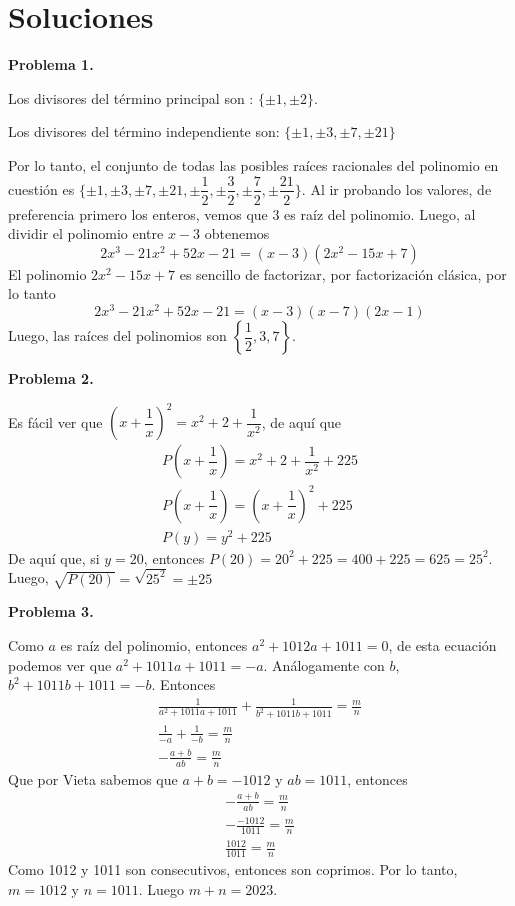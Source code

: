 \newpage
\section*{\large Soluciones}

    \textbf{Problema 1.}

Los divisores del término principal son : $\{\pm 1, \pm 2\}$.

Los divisores del término independiente son: $\{\pm 1, \pm 3, \pm 7, \pm 21\}$

Por lo tanto, el conjunto de todas las posibles raíces racionales del polinomio en cuestión es $\{\pm 1, \pm 3, \pm 7, \pm 21, \pm \dfrac{1}{2}, \pm \dfrac{3}{2}, \pm \dfrac{7}{2}, \pm \dfrac{21}{2}\}.$
Al ir probando los valores, de preferencia primero los enteros, vemos que $3$ es raíz del polinomio.
Luego, al dividir el polinomio entre $x - 3$ obtenemos
\[2 x^3 - 21 x^2 + 52 x - 21 = (x - 3)(2x^2 - 15x + 7)\]
El polinomio $2x^2 - 15x + 7$ es sencillo de factorizar, por factorización clásica, por lo tanto
\[2 x^3 - 21 x^2 + 52 x - 21 = (x - 3)(x - 7)(2x - 1)\]
Luego, las raíces del polinomios son $\left\{ \dfrac{1}{2}, 3, 7 \right\}$.


\textbf{Problema 2.}

Es fácil ver que $\left(x + \dfrac{1}{x}\right)^2 = x^2 + 2 + \dfrac{1}{x^2}$, de aquí que
\begin{gather*}
    P\left(x + \dfrac{1}{x}\right) = x^2 + 2 + \dfrac{1}{x^2} + 225\\
    P\left(x + \dfrac{1}{x}\right) = \left(x + \dfrac{1}{x}\right)^2 + 225\\
    P(y) =  y^2 + 225
\end{gather*}
De aquí que, si $y = 20$, entonces $P(20) = 20^2 + 225 = 400 + 225 = 625 = 25^2$.
Luego, $\sqrt {P(20)} =\sqrt {25^2} = \boxed{\pm 25}$


\textbf{Problema 3.}

Como $a$ es raíz del polinomio, entonces $a^2 + 1012a + 1011 = 0$, de esta ecuación podemos ver que $\boxed{a^2 + 1011a + 1011 = -a}$.
Análogamente con $b$, $\boxed{b^2 + 1011b + 1011 = -b}$.
Entonces
\begin{gather*}
    \frac{1}{a^2 + 1011a + 1011} + \frac{1}{b^2 + 1011b + 1011} = \frac{m}{n}\\
    \frac{1}{-a} + \frac{1}{-b} = \frac{m}{n}\\
    -\frac{a + b}{ab} = \frac{m}{n}
\end{gather*}
Que por Vieta sabemos que $a + b = - 1012$ y $ab = 1011$, entonces
\begin{gather*}
    -\frac{a + b}{ab} = \frac{m}{n}\\
    -\frac{-1012}{1011} = \frac{m}{n}\\
    \frac{1012}{1011} = \frac{m}{n}
\end{gather*}
Como 1012 y 1011 son consecutivos, entonces son coprimos.
Por lo tanto, $m = 1012$ y $n = 1011$.
Luego $m + n = \boxed{2023}.$

